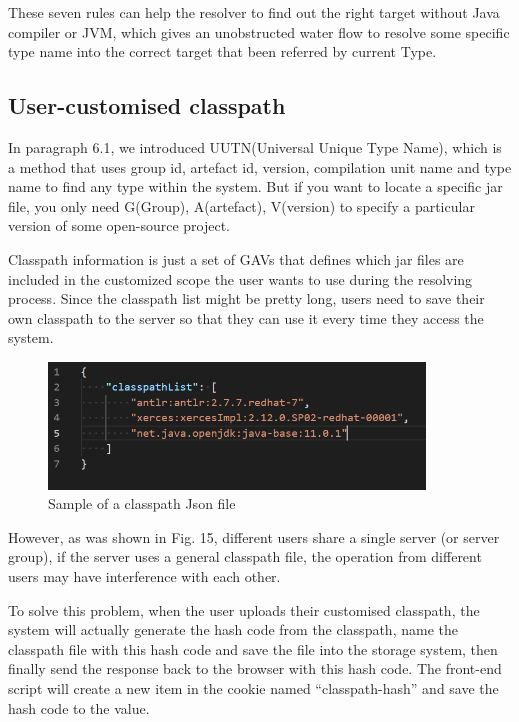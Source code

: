 \documentclass[runningheads]{llncs}
\begin{document}
These seven rules can help the resolver to find out the right target without Java compiler or JVM, which gives an unobstructed water flow to resolve some specific type name into the correct target that been referred by current Type.

\subsection{User-customised classpath}
In paragraph 6.1, we introduced UUTN(Universal Unique Type Name), which is a method that uses group id, artefact id, version, compilation unit name and type name to find any type within the system. But if you want to locate a specific jar file, you only need G(Group), A(artefact), V(version) to specify a particular version of some open-source project.

Classpath information is just a set of GAVs that defines which jar files are included in the customized scope the user wants to use during the resolving process. Since the classpath list might be pretty long, users need to save their own classpath to the server so that they can use it every time they access the system.


\begin{figure}[H]
	\centering
	\includegraphics[width=10cm]{pic/classpath-json.png}
	\caption{Sample of a classpath Json file}
	\label{Sample of a classpath Json file}
\end{figure}

However, as was shown in Fig. 15, different users share a single server (or server group), if the server uses a general classpath file, the operation from different users may have interference with each other.

To solve this problem, when the user uploads their customised classpath, the system will actually generate the hash code from the classpath, name the classpath file with this hash code and save the file into the storage system, then finally send the response back to the browser with this hash code. The front-end script will create a new item in the cookie named “classpath-hash” and save the hash code to the value.
\end{document}
